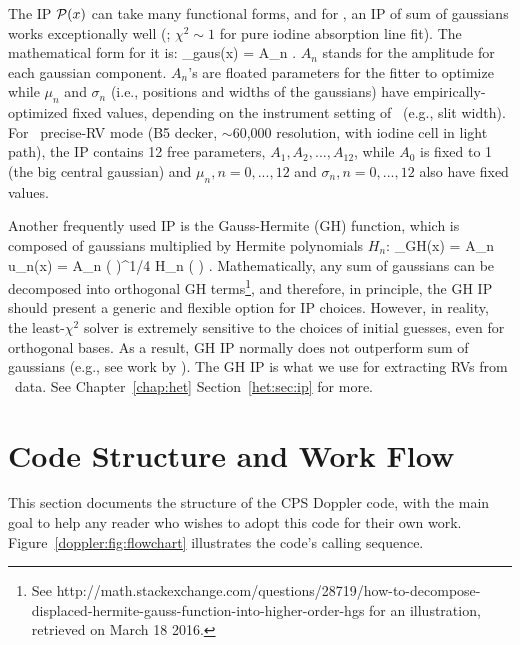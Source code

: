 The IP $\mathcal{P}(x)$ can take many functional forms, and for \keck, an
IP of sum of gaussians works exceptionally well
(\citealt{1995PASP..107..966V}; $\chi^2 \sim 1$ for pure iodine
absorption line fit). The mathematical form for it is:
\beq
\curlyp_{\rm gaus}(x) = \sum A_n . 
\eeq
$A_n$ stands for the amplitude for each gaussian component. $A_n$'s
are floated parameters for the fitter to optimize while $\mu_n$ and
$\sigma_n$ (i.e., positions and widths of the gaussians) have
empirically-optimized fixed values, depending on the instrument
setting of \keck\ (e.g., slit width). For \keck\ precise-RV mode (B5
decker, $\sim$60,000 resolution, with iodine cell in light path), the
IP contains 12 free parameters, $A_1, A_2, ..., A_{12}$, while $A_0$
is fixed to 1 (the big central gaussian) and $\mu_n, n=0,...,12$ and
$\sigma_n, n=0,...,12$ also have fixed values.

Another frequently used IP is the Gauss-Hermite (GH)
function, which is composed of gaussians multiplied by Hermite
polynomials $H_n$:
\beq
\curlyp_{\rm GH}(x) = \sum A_n u_n(x) = \sum A_n 
\left(  \right)^{1/4}  H_n
\left(  \right) .
\eeq
Mathematically, any sum of gaussians can be decomposed into orthogonal
GH terms\footnote{See
  http://math.stackexchange.com/questions/28719/how-to-decompose-displaced-hermite-gauss-function-into-higher-order-hgs
  for an illustration, retrieved on March 18 2016.}, and therefore, in
principle, the GH IP should present a generic and flexible option for
IP choices. However, in reality, the least-$\chi^2$ solver is
extremely sensitive to the choices of initial guesses, even for
orthogonal bases. As a result, GH IP normally does not outperform sum
of gaussians (e.g., see work by \citealt{2013AAS...22114908V}). The GH
IP is what we use for extracting RVs from \het\ data. See
Chapter~\ref{chap:het} Section~\ref{het:sec:ip} for more.



\section{Code Structure and Work Flow}

This section documents the structure of the CPS Doppler code, with the
main goal to help any reader who wishes to adopt this code for their
own work. Figure~\ref{doppler:fig:flowchart} illustrates the code's
calling sequence. 


